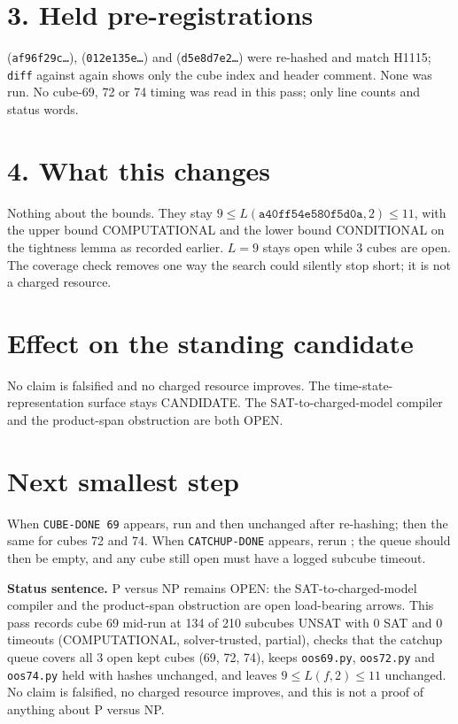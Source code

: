 \documentclass[11pt]{article}
\begin{document}
\section*{3. Held pre-registrations}
 (\texttt{af96f29c\ldots}),  (\texttt{012e135e\ldots}) and  (\texttt{d5e8d7e2\ldots}) were re-hashed and match H1115; \texttt{diff} against  again shows only the cube index and header comment. None was run. No cube-69, 72 or 74 timing was read in this pass; only line counts and status words.

\section*{4. What this changes}
Nothing about the bounds. They stay $9\le L(\texttt{a40ff54e580f5d0a},2)\le 11$, with the upper bound COMPUTATIONAL and the lower bound CONDITIONAL on the tightness lemma as recorded earlier. $L=9$ stays open while 3 cubes are open. The coverage check removes one way the search could silently stop short; it is not a charged resource.

\section*{Effect on the standing candidate}
No claim is falsified and no charged resource improves. The time-state-representation surface stays CANDIDATE. The SAT-to-charged-model compiler and the product-span obstruction are both OPEN.

\section*{Next smallest step}
When \texttt{CUBE-DONE 69} appears, run  and then  unchanged after re-hashing; then the same for cubes 72 and 74. When \texttt{CATCHUP-DONE} appears, rerun ; the queue should then be empty, and any cube still open must have a logged subcube timeout.

\bigskip
\noindent\textbf{Status sentence.} P versus NP remains OPEN: the SAT-to-charged-model compiler and the product-span obstruction are open load-bearing arrows. This pass records cube 69 mid-run at 134 of 210 subcubes UNSAT with 0 SAT and 0 timeouts (COMPUTATIONAL, solver-trusted, partial), checks that the catchup queue covers all 3 open kept cubes (69, 72, 74), keeps \texttt{oos69.py}, \texttt{oos72.py} and \texttt{oos74.py} held with hashes unchanged, and leaves $9\le L(f,2)\le 11$ unchanged. No claim is falsified, no charged resource improves, and this is not a proof of anything about P versus NP.
\end{document}
